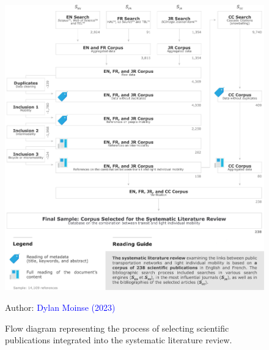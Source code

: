 \begin{refsegment}
    \begin{figure}[h!]\vspace*{4pt}
        \caption{Flow diagram representing the process of selecting scientific publications integrated into the systematic literature review.}
        \label{fig-chap2:diagramme-flux-selection-publications-rsl}
        \centerline{\includegraphics[width=1\columnwidth]{src/Figures/Chap-2/EN_RSL_Diagramme_flux_selection_publications.pdf}}
        \vspace{5pt}
        \begin{flushright}\scriptsize{
        Author: \textcolor{blue}{Dylan Moinse (2023)}
        }\end{flushright}
    \end{figure}


\end{refsegment}
